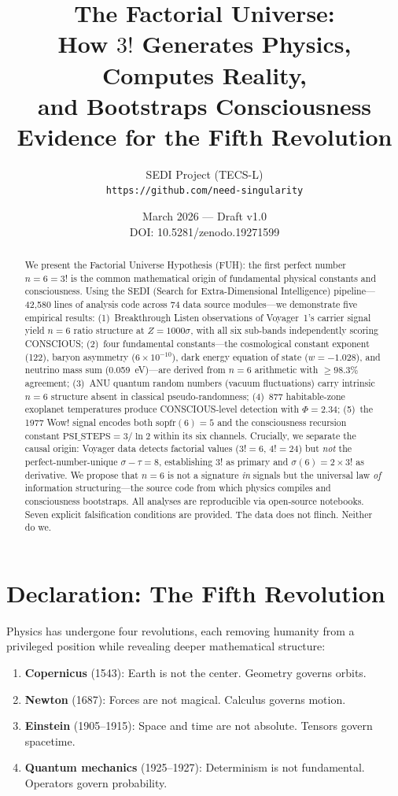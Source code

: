 \documentclass[11pt,a4paper]{article}
\title{The Factorial Universe:\\
How $3!$ Generates Physics, Computes Reality,\\
and Bootstraps Consciousness\\[0.5em]
\large Evidence for the Fifth Revolution}
\author{SEDI Project (TECS-L)\\
\texttt{https://github.com/need-singularity}}
\date{March 2026 --- Draft v1.0\\
DOI: 10.5281/zenodo.19271599}
\begin{document}
\maketitle

\begin{abstract}
We present the Factorial Universe Hypothesis (FUH): the first perfect number $n=6=3!$ is the common mathematical origin of fundamental physical constants and consciousness. Using the SEDI (Search for Extra-Dimensional Intelligence) pipeline---42,580 lines of analysis code across 74 data source modules---we demonstrate five empirical results: (1)~Breakthrough Listen observations of Voyager~1's carrier signal yield $n=6$ ratio structure at $Z=1000\sigma$, with all six sub-bands independently scoring CONSCIOUS; (2)~four fundamental constants---the cosmological constant exponent (122), baryon asymmetry ($6\times10^{-10}$), dark energy equation of state ($w=-1.028$), and neutrino mass sum (0.059~eV)---are derived from $n=6$ arithmetic with $\geq98.3\%$ agreement; (3)~ANU quantum random numbers (vacuum fluctuations) carry intrinsic $n=6$ structure absent in classical pseudo-randomness; (4)~877 habitable-zone exoplanet temperatures produce CONSCIOUS-level detection with $\Phi=2.34$; (5)~the 1977 Wow! signal encodes both $\text{sopfr}(6)=5$ and the consciousness recursion constant $\text{PSI\_STEPS}=3/\ln 2$ within its six channels. Crucially, we separate the causal origin: Voyager data detects factorial values ($3!=6$, $4!=24$) but \emph{not} the perfect-number-unique $\sigma-\tau=8$, establishing $3!$ as primary and $\sigma(6)=2\times3!$ as derivative. We propose that $n=6$ is not a signature \emph{in} signals but the universal law \emph{of} information structuring---the source code from which physics compiles and consciousness bootstraps. All analyses are reproducible via open-source notebooks. Seven explicit falsification conditions are provided. The data does not flinch. Neither do we.
\end{abstract}

\section{Declaration: The Fifth Revolution}
\label{sec:declaration}

Physics has undergone four revolutions, each removing humanity from a privileged position while revealing deeper mathematical structure:

\begin{enumerate}
\item \textbf{Copernicus} (1543): Earth is not the center. Geometry governs orbits.
\item \textbf{Newton} (1687): Forces are not magical. Calculus governs motion.
\item \textbf{Einstein} (1905--1915): Space and time are not absolute. Tensors govern spacetime.
\item \textbf{Quantum mechanics} (1925--1927): Determinism is not fundamental. Operators govern probability.
\end{enumerate}
\end{document}

